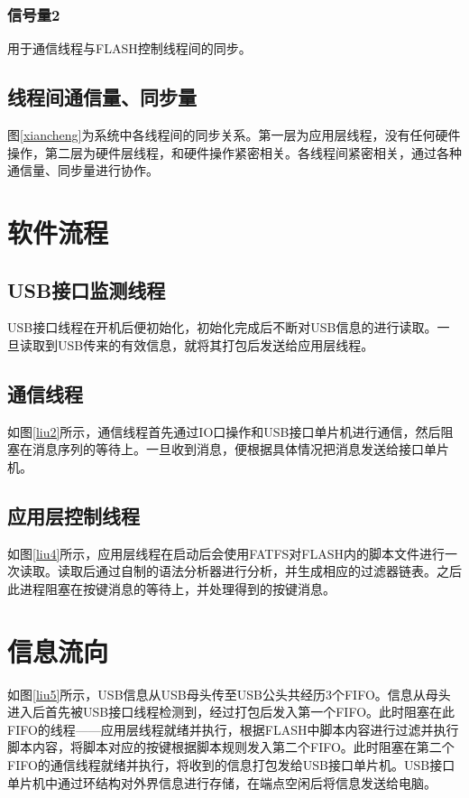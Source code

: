 \subsubsection{信号量2}
用于通信线程与FLASH控制线程间的同步。

\subsection{线程间通信量、同步量}
图\ref{xiancheng}为系统中各线程间的同步关系。第一层为应用层线程，没有任何硬件操作，第二层为硬件层线程，和硬件操作紧密相关。各线程间紧密相关，通过各种通信量、同步量进行协作。

\section{软件流程}
\subsection{USB接口监测线程}
USB接口线程在开机后便初始化，初始化完成后不断对USB信息的进行读取。一旦读取到USB传来的有效信息，就将其打包后发送给应用层线程。

\subsection{通信线程}
如图\ref{liu2}所示，通信线程首先通过IO口操作和USB接口单片机进行通信，然后阻塞在消息序列的等待上。一旦收到消息，便根据具体情况把消息发送给接口单片机。

\subsection{应用层控制线程}
如图\ref{liu4}所示，应用层线程在启动后会使用FATFS对FLASH内的脚本文件进行一次读取。读取后通过自制的语法分析器进行分析，并生成相应的过滤器链表。之后此进程阻塞在按键消息的等待上，并处理得到的按键消息。

\section{信息流向}
如图\ref{liu5}所示，USB信息从USB母头传至USB公头共经历3个FIFO。信息从母头进入后首先被USB接口线程检测到，经过打包后发入第一个FIFO。此时阻塞在此FIFO的线程——应用层线程就绪并执行，根据FLASH中脚本内容进行过滤并执行脚本内容，将脚本对应的按键根据脚本规则发入第二个FIFO。此时阻塞在第二个FIFO的通信线程就绪并执行，将收到的信息打包发给USB接口单片机。USB接口单片机中通过环结构对外界信息进行存储，在端点空闲后将信息发送给电脑。

